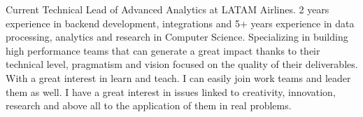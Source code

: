 

\begin{cvparagraph}

Current Technical Lead of Advanced Analytics at LATAM Airlines. 2 years experience in backend development, integrations and 5+ years experience in data processing, analytics and research in Computer Science.
Specializing in building high performance teams that can generate a great impact thanks to their technical level, pragmatism and vision focused on the quality of their deliverables. With a great interest in learn and teach. I can easily join work teams and leader them as well. I have a great interest in issues linked to creativity, innovation, research and above all to the application of them in real problems.
\end{cvparagraph}
